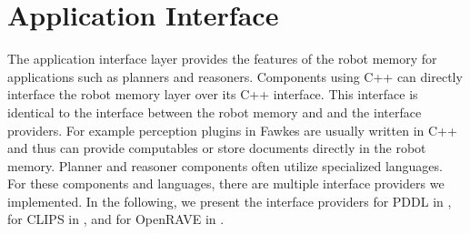 \section{Application Interface}
\label{sec:impl-planner}
The application interface layer provides the features of the robot
memory for applications such as planners and reasoners. Components
using C++ can directly interface the robot memory layer over its C++
interface. This interface is identical to the interface between the
robot memory and and the interface providers. For example perception
plugins in Fawkes are usually written in C++ and thus can provide
computables or store documents directly in the robot memory. Planner
and reasoner components often utilize specialized languages. For these
components and languages, there are multiple interface providers we
implemented. In the following, we present the interface providers for
PDDL in , for CLIPS in ,
and for OpenRAVE in .

